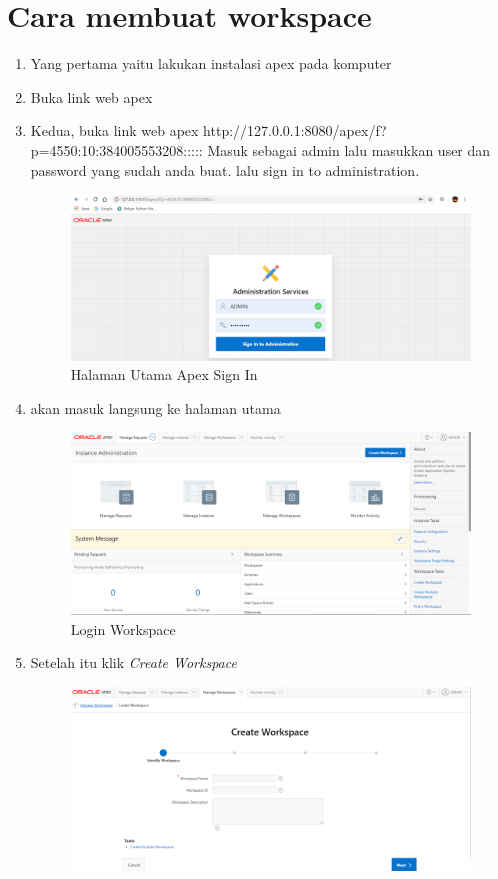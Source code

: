 \section{Cara membuat workspace}
\begin{enumerate}
    \item Yang pertama yaitu lakukan instalasi apex pada komputer
    \item Buka link web apex
        \item Kedua, buka link web apex http://127.0.0.1:8080/apex/f?p=4550:10:384005553208::::: 
        Masuk sebagai admin lalu masukkan user dan password yang sudah anda buat. lalu sign in to administration.
    \begin{figure}[!htbp]
        \centering
        \includegraphics[scale=0.3]{figures/a.PNG}
        \caption{Halaman Utama Apex Sign In}
     \end{figure}
    \item  akan masuk langsung ke halaman utama
     \begin{figure}[!htbp]
        \centering
        \includegraphics[scale=0.3]{figures/n1.PNG}
        \caption{Login Workspace}
    \end{figure}
    \item Setelah itu klik \textit{Create Workspace}
    \begin{figure}[!htbp]
        \centering
        \includegraphics[scale=0.3]{figures/n2.PNG}

\end{figure}
\end{enumerate}
